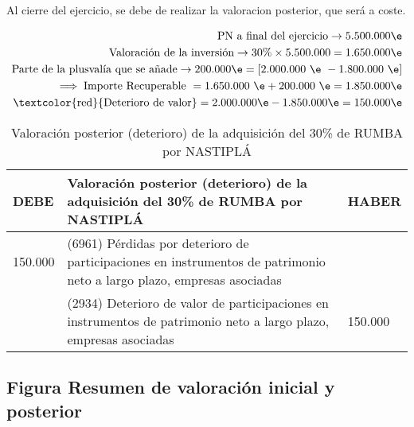 Al cierre del ejercicio, se debe de realizar la valoracion posterior, que será a coste.  

\begin{align*}
    \text{PN a final del ejercicio} \rightarrow 5.500.000 \e \\
    \text{Valoración de la inversión} \rightarrow 30\% \times 5.500.000 = 1.650.000 \e \\
    \text{Parte de la plusvalía que se añade} \rightarrow 200.000 \e = \left[\text{2.000.000 \e  } - \text{1.800.000 \e}\right]\\
    \implies \text{Importe Recuperable } =  \text{1.650.000 \e} + \text{200.000 \e} = 1.850.000 \e \\
    \text{\textcolor{red}{Deterioro de valor}} = 2.000.000 \e - 1.850.000 \e = 150.000 \e
\end{align*}

\begin{table}[H]
    \centering
    \begin{tabular}{|p{3cm}|p{6cm}|p{3cm}|}
    \hline
    \rowcolor{blue!30}
    \textbf{DEBE} & \textbf{Valoración posterior (deterioro) de la adquisición del 30\% de RUMBA por NASTIPLÁ} & \textbf{HABER} \\
    \hline
    150.000 & (6961) Pérdidas por deterioro de participaciones en instrumentos de patrimonio neto a largo plazo, empresas asociadas & \\
    \hline
    & (2934) Deterioro de valor de participaciones en instrumentos de patrimonio neto a largo plazo, empresas asociadas & 150.000 \\
    \hline
    \end{tabular}
    \caption{Valoración posterior (deterioro) de la adquisición del 30\% de RUMBA por NASTIPLÁ}
    \label{tabla:deterioro_valor_12}
\end{table}

\newpage 

\subsection*{Figura Resumen de valoración inicial y posterior}

